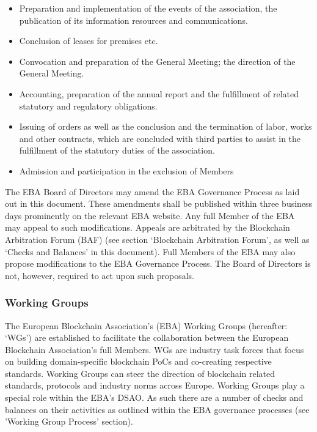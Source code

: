 \documentclass{article}
\begin{document}
\begin{itemize}
	\item {Preparation and implementation of the events of the association, the publication of its information resources and communications.}
	\item {Conclusion of leases for premises etc.}
	\item {Convocation and preparation of the General Meeting; the direction of the General Meeting.}
	\item {Accounting, preparation of the annual report and the fulfillment of related statutory and regulatory obligations.}
	\item {Issuing of orders as well as the conclusion and the termination of labor, works and other contracts, which are concluded with third parties to assist in the fulfillment of the statutory duties of the association.}
	\item {Admission and participation in the exclusion of Members}
\end{itemize}

The EBA Board of Directors may amend the EBA Governance Process as laid out in this document. 
These amendments shall be published within three business days prominently on the relevant EBA website.
Any full Member of the EBA may appeal to such modifications. 
Appeals are arbitrated by the Blockchain Arbitration Forum (BAF) (see section ‘Blockchain Arbitration Forum’, as well as ‘Checks and Balances’ in this document). 
Full Members of the EBA may also propose modifications to the EBA Governance Process. 
The Board of Directors is not, however, required to act upon such proposals.

\subsubsection{Working Groups}

The European Blockchain Association’s (EBA) Working Groups (hereafter: ‘WGs’) are established to facilitate the collaboration between the European Blockchain Association’s full Members. 
WGs are industry task forces that focus on building domain-specific blockchain PoCs and co-creating respective standards. 
Working Groups can steer the direction of blockchain related standards, protocols and industry norms across Europe. 
Working Groups play a special role within the EBA’s DSAO. 
As such there are a number of checks and balances on their activities as outlined within the EBA governance processes (see 'Working Group Process' section). 
\end{document}
